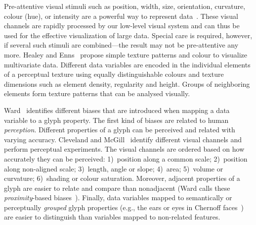 Pre-attentive visual stimuli such as position, width, size, orientation, curvature, colour (hue), or intensity are a powerful way to represent data~\cite{ClevelandMcGill84Perception, Healey96preattentive}.
These visual channels are rapidly processed by our low-level visual system and can thus be used for the effective visualization of large data.
Special care is required, however, if several such stimuli are combined---the result may not be pre-attentive any more.
Healey and Enns~\cite{healey99largeDatasetsAtGlance} propose simple texture patterns and colour to visualize multivariate data.
Different data variables are encoded in the individual elements of a perceptual texture %
using equally distinguishable colours and texture dimensions such as element density, regularity and height.
Groups of neighboring elements form texture patterns that can be analysed visually.

Ward~\cite{ward08glyphs} identifies different biases that are introduced when mapping a data variable to a glyph property.  The first kind of biases are related to human \emph{perception}.
Different properties of a glyph can be perceived and related with varying accuracy. Cleveland and McGill~\cite{ClevelandMcGill84Perception} identify different visual channels and perform perceptual experiments.
The visual channels are ordered based on how accurately they can be perceived: 1)~position along a common scale; 
2)~position along non-aligned scale; 3)~length, angle or slope; 4)~area; 
5)~volume or curvature; 6)~shading or colour saturation.
Moreover, adjacent properties of a glyph are easier to relate and compare than nonadjacent (Ward calls these \emph{proximity}-based biases~\cite{ward08glyphs}).
Finally, data variables mapped to semantically or perceptually \emph{grouped} glyph properties (e.g., the ears or eyes in Chernoff faces~\cite{Chernoff73faces}) are easier to distinguish than variables mapped to non-related features.

